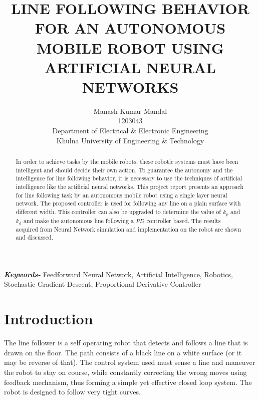 \documentclass[14pt,a4paper]{extarticle}
\begin{document}
\title{LINE FOLLOWING BEHAVIOR FOR AN AUTONOMOUS MOBILE ROBOT USING ARTIFICIAL NEURAL NETWORKS}

\author{Manash Kumar Mandal\\ 1203043 \\ Department of Electrical \& Electronic Engineering \\ Khulna University of Engineering \& Technology}

\date{}

\maketitle
	

\tableofcontents

\newpage


\begin{abstract}

In order to achieve tasks by the mobile robots, these robotic systems must have been intelligent and should decide their own action. To guarantee the autonomy and the intelligence for line following behavior, it is necessary to use the techniques of artificial intelligence like the artificial neural networks. This project report presents an approach for line following task by an autonomous mobile robot using a single layer neural network. The proposed controller is used for following any line on a plain surface with different width. This controller can also be upgraded to determine the value of $k_{p}$ and $k_{d}$ and make the autonomous line following a $PD$ controller based. The results acquired from Neural Network simulation and implementation on the robot are shown and discussed.

\end{abstract}

\providecommand{\keywords}[1]{\textbf{\textit{Keywords-}} #1}

\keywords{Feedforward Neural Network, Artificial Intelligence, Robotics, Stochastic Gradient Descent, Proportional Derivative Controller}

\section{Introduction}

The line follower is a self operating robot that detects and follows a line that is drawn on the floor. The path consists of a black line on a white surface (or it may be reverse of that). The control system used must sense a line and maneuver the robot to stay on course, while constantly correcting the wrong moves using feedback mechanism, thus forming a simple yet effective closed loop system. The robot is designed to follow very tight curves. 
\end{document}
